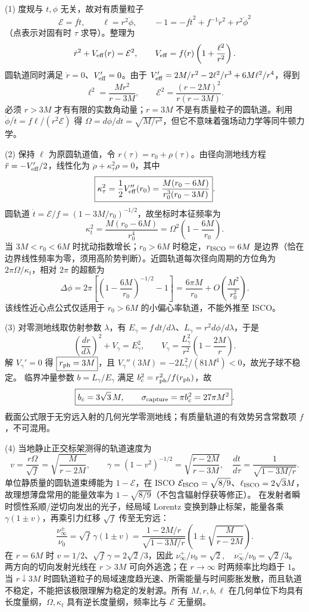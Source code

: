 (1) 度规与 \(t,\phi\) 无关，故对有质量粒子
\[
\mathcal E=f\dot t,\qquad \ell=r^2\dot\phi,\qquad
-1=-f\dot t^2+f^{-1}\dot r^2+r^2\dot\phi^2
\]
（点表示对固有时 \(\tau\) 求导）。整理为
\[
\dot r^2+V_{\rm eff}(r)=\mathcal E^2,\qquad
V_{\rm eff}=f(r)\left(1+\frac{\ell^2}{r^2}\right).
\]
圆轨道同时满足 \(\dot r=0\)、\(V_{\rm eff}'=0\)。由于
\(V_{\rm eff}'=2M/r^2-2\ell^2/r^3+6M\ell^2/r^4\)，得到
\[
\boxed{\ell^2=\frac{Mr^2}{r-3M}},\qquad
\boxed{\mathcal E^2=\frac{(r-2M)^2}{r(r-3M)}}.
\]
必须 \(r>3M\) 才有有限的实数角动量；\(r=3M\) 不是有质量粒子的圆轨道。利用 \(\dot\phi/\dot t=f\ell/(r^2\mathcal E)\) 得
\(\boxed{\Omega=d\phi/dt=\sqrt{M/r^3}}\)，但它不意味着强场动力学等同牛顿力学。

(2) 保持 \(\ell\) 为原圆轨道值，令 \(r(\tau)=r_0+\rho(\tau)\)。由径向测地线方程
\(\ddot r=-V_{\rm eff}'/2\)，线性化为
\(\ddot\rho+\kappa_\tau^2\rho=0\)，其中
\[
\boxed{\kappa_\tau^2=\frac12 V_{\rm eff}''(r_0)
=\frac{M(r_0-6M)}{r_0^3(r_0-3M)}}.
\]
圆轨道 \(\dot t=\mathcal E/f=(1-3M/r_0)^{-1/2}\)，故坐标时本征频率为
\[
\boxed{\kappa_t^2=\frac{M(r_0-6M)}{r_0^4}
=\Omega^2\left(1-\frac{6M}{r_0}\right)}.
\]
当 \(3M<r_0<6M\) 时扰动指数增长；\(r_0>6M\) 时稳定，\(r_{\rm ISCO}=6M\) 是边界（恰在边界线性频率为零，须用高阶势判断）。近圆轨道每次径向周期的方位角为 \(2\pi\Omega/\kappa_t\)，相对 \(2\pi\) 的超额为
\[
\boxed{\Delta\phi=2\pi\left[\left(1-\frac{6M}{r_0}\right)^{-1/2}-1\right]
=\frac{6\pi M}{r_0}+O\!\left(\frac{M^2}{r_0^2}\right)}.
\]
该线性近心点公式仅适用于 \(r_0>6M\) 的小偏心率轨道，不能外推至 ISCO。

(3) 对零测地线取仿射参数 \(\lambda\)，有
\(E_\gamma=f\,dt/d\lambda\)、\(L_\gamma=r^2d\phi/d\lambda\)，于是
\[
\left(\frac{dr}{d\lambda}\right)^2+V_\gamma=E_\gamma^2,\qquad
V_\gamma=\frac{L_\gamma^2}{r^2}\left(1-\frac{2M}{r}\right).
\]
解 \(V_\gamma'=0\) 得 \(\boxed{r_{\rm ph}=3M}\)，且
\(V_\gamma''(3M)=-2L_\gamma^2/(81M^4)<0\)，故光子球不稳定。
临界冲量参数 \(b=L_\gamma/E_\gamma\) 满足 \(b_c^2=r_{\rm ph}^2/f(r_{\rm ph})\)，故
\[
\boxed{b_c=3\sqrt3\,M,\qquad \sigma_{\rm capture}=\pi b_c^2=27\pi M^2}.
\]
截面公式限于无穷远入射的几何光学零测地线；有质量轨道的有效势另含常数项 \(f\)，不可混用。

(4) 当地静止正交标架测得的轨道速度为
\[
\boxed{v=\frac{r\Omega}{\sqrt f}=\sqrt{\frac{M}{r-2M}}},\qquad
\gamma=(1-v^2)^{-1/2}=\sqrt{\frac{r-2M}{r-3M}},
\quad \frac{dt}{d\tau}=\frac{1}{\sqrt{1-3M/r}}.
\]
单位静质量的圆轨道束缚能为 \(1-\mathcal E\)，在 ISCO
\(\mathcal E_{\rm ISCO}=\sqrt{8/9}\)、\(\ell_{\rm ISCO}=2\sqrt3 M\)，
故理想薄盘常用的能量效率为 \(1-\sqrt{8/9}\)（不包含辐射俘获等修正）。
在发射者瞬时惯性系顺/逆切向发出的光子，经局域 Lorentz 变换到静止标架，能量各乘 \(\gamma(1\pm v)\)，再乘引力红移 \(\sqrt f\) 传至无穷远：
\[
\boxed{\frac{\nu_\infty^\pm}{\nu_0}
=\sqrt f\,\gamma(1\pm v)
=\frac{1-2M/r}{\sqrt{1-3M/r}}
\left(1\pm\sqrt{\frac{M}{r-2M}}\right)}.
\]
在 \(r=6M\) 时 \(v=1/2\)、\(\sqrt f\,\gamma=2\sqrt2/3\)，因此
\(\boxed{\nu_\infty^+/\nu_0=\sqrt2,\quad \nu_\infty^-/\nu_0=\sqrt2/3}\)。
两方向的切向发射光线在 \(r>3M\) 可向外逃逸；在 \(r\to\infty\) 时两频率比均趋于 \(1\)。当 \(r\downarrow3M\) 时圆轨道粒子的局域速度趋光速、所需能量与时间膨胀发散，而且轨道不稳定，不能把该极限理解为稳定的发射源。所有 \(M,r,b,\ell\) 在几何单位下均具有长度量纲，\(\Omega,\kappa_t\) 具有逆长度量纲，频率比与 \(\mathcal E\) 无量纲。
